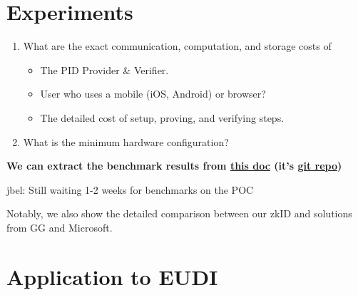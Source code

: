 \documentclass{iacrtrans}
\newcommand{\jbel}[1]{{\color{blue}{}jbel: #1}}
\begin{document}



\section{Experiments}
\label{sec:experiments}
\begin{enumerate}
    \item What are the exact communication, computation, and storage costs of \begin{itemize}
        \item The PID Provider \& Verifier.
        \item User who uses a mobile (iOS, Android) or browser?
        \item The detailed cost of setup, proving, and verifying steps.
    \end{itemize}
    \item What is the minimum hardware configuration? 
\end{enumerate}

\textbf{We can extract the benchmark results from \href{https://hackmd.io/@clientsideproving/zkIDBenchmarks}{this doc} (it's \href{https://github.com/privacy-scaling-explorations/zkid-benchmarks}{git repo}) }

\jbel{Still waiting 1-2 weeks for benchmarks on the POC}

Notably, we also show the detailed comparison between our zkID and solutions from GG and Microsoft.


\section{Application to EUDI}
\label{sec:appeudi}

\end{document}
